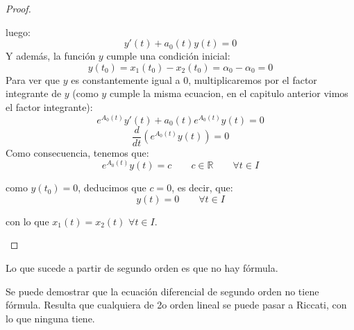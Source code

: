 \begin{prop}
\begin{proof}
\begin{description}
                luego:
                \begin{equation*}
                    y'(t) + a_0(t)y(t) = 0
                \end{equation*}
                Y además, la función $y$ cumple una condición inicial: 
                \begin{equation*}
                    y(t_0) = x_1(t_0) - x_2(t_0) = \alpha_0 - \alpha_0 = 0
                \end{equation*}
                Para ver que $y$ es constantemente igual a 0, multiplicaremos por el factor integrante de $y$ (como $y$ cumple la misma ecuacion, en el capitulo anterior vimos el factor integrante):
                \begin{equation*}
                    e^{A_0(t)} y'(t)+ a_0(t) e^{A_0(t)} y(t) = 0
                \end{equation*}
                \begin{equation*}
                    \dfrac{d}{dt}\left(e^{A_0(t)}y(t)\right) = 0
                \end{equation*}
                Como consecuencia, tenemos que:
                \begin{equation*}
                    e^{A_0(t)} y(t) = c \qquad c\in \mathbb{R} \qquad \forall t\in I
                \end{equation*}

                como $y(t_0) = 0$, deducimos que $c=0$, es decir, que:
                \begin{equation*}
                    y(t) = 0 \qquad \forall t\in I
                \end{equation*}

                con lo que $x_1(t) = x_2(t)$ $\forall t\in I$.
        \end{description}
    \end{proof}
\end{prop}

Lo que sucede a partir de segundo orden es que no hay fórmula.

Se puede demostrar que la ecuación diferencial de segundo orden no tiene fórmula.
Resulta que cualquiera de 2o orden lineal se puede pasar a Riccati, con lo que ninguna tiene.
